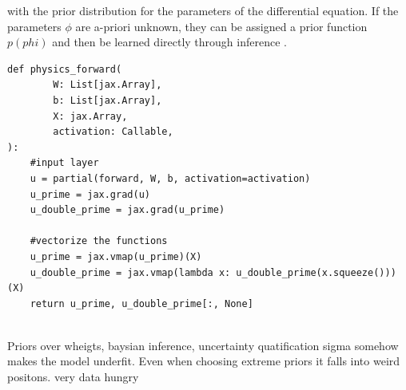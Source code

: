 \documentclass{article}
\begin{document}
with the prior distribution for the parameters of the differential equation. If the parameters $\phi$ are a-priori unknown, they can be assigned a prior function $p(phi)$ and then be learned directly through inference \cite{raissi2017physicsIDL, Yang_2021}.
\begin{lstlisting}
def physics_forward(
        W: List[jax.Array],
        b: List[jax.Array],
        X: jax.Array,
        activation: Callable,
):
    #input layer
    u = partial(forward, W, b, activation=activation)
    u_prime = jax.grad(u)
    u_double_prime = jax.grad(u_prime)

    #vectorize the functions
    u_prime = jax.vmap(u_prime)(X)
    u_double_prime = jax.vmap(lambda x: u_double_prime(x.squeeze()))(X)
    return u_prime, u_double_prime[:, None]
\end{lstlisting}
\\
    
Priors over wheigts, baysian inference, uncertainty quatification sigma somehow makes the model underfit. Even when choosing extreme priors it falls into weird positons. very data hungry
\end{document}
